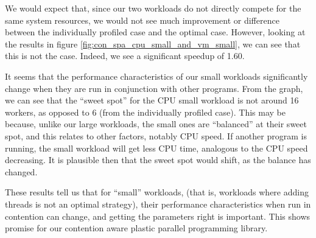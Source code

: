 We would expect that, since our two workloads do not directly compete for the same system resources, we would not see much improvement or difference between the individually profiled case and the optimal case. However, looking at the results in figure \ref{fig:con_spa_cpu_small_and_vm_small}, we can see that this is not the case. Indeed, we see a significant speedup of 1.60. 

It seems that the performance characteristics of our small workloads significantly change when they are run in conjunction with other programs. From the graph, we can see that the ``sweet spot'' for the CPU small workload is not around 16 workers, as opposed to 6 (from the individually profiled case). This may be because, unlike our large workloads, the small ones are ``balanced'' at their sweet spot, and this relates to other factors, notably CPU speed. If another program is running, the small workload will get less CPU time, analogous to the CPU speed decreasing. It is plausible then that the sweet spot would shift, as the balance has changed.

These results tell us that for ``small'' workloads, (that is, workloads where adding threads is not an optimal strategy), their performance characteristics when run in contention can change, and getting the parameters right is important. This shows promise for our contention aware plastic parallel programming library.



